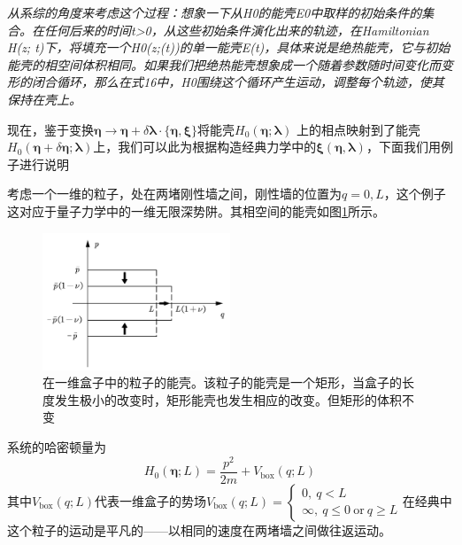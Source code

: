 \emph{从系综的角度来考虑这个过程：想象一下从H0的能壳E0中取样的初始条件的集合。在任何后来的时间t>0，从这些初始条件演化出来的轨迹，在Hamiltonian H(z; t)下，将填充一个H0(z;(t))的单一能壳E(t)，具体来说是绝热能壳，它与初始能壳的相空间体积相同。如果我们把绝热能壳想象成一个随着参数随时间变化而变形的闭合循环，那么在式16中，H0围绕这个循环产生运动，调整每个轨迹，使其保持在壳上。}

现在，鉴于变换$\bm{\eta} \to \bm{\eta} + \delta  \bm{\lambda} \cdot \{\bm{\eta}, \boldsymbol{\xi}\}$将能壳$H_{0}(\bm{\eta} ; \boldsymbol{\lambda})$ 上的相点映射到了能壳 $ H_{0}(\bm{\eta} + \delta \bm{\eta} ; \boldsymbol{\lambda})$上，我们可以此为根据构造经典力学中的$\boldsymbol{\xi}(\bm{\eta}, \boldsymbol{\lambda})$，下面我们用例子进行说明

考虑一个一维的粒子，处在两堵刚性墙之间，刚性墙的位置为$q=0,L$，这个例子这对应于量子力学中的一维无限深势阱。其相空间的能壳如图\ref{p2.1}所示。
\begin{figure}[!htbp]
    \begin{center}
        \includegraphics[width=0.5\textwidth]{figures/p2.1.pdf}
    \end{center}
    \caption{在一维盒子中的粒子的能壳。该粒子的能壳是一个矩形，当盒子的长度发生极小的改变时，矩形能壳也发生相应的改变。但矩形的体积不变}
    \label{p2.1}
\end{figure}

系统的哈密顿量为
\begin{equation}
     H_{0}(\bm{\eta} ; L)=\frac{p^{2}}{2 m}+V_{\mathrm{box}}(q ; L)
        \label{eq2.18}
\end{equation}
其中$V_{\mathrm{box}}(q ; L)$代表一维盒子的势场$V_{\mathrm{box}}(q ; L) = \left\{\begin{array}{l} 0 ,\ q<L\\ \infty ,\ q \leq 0\ \text{or}\ q \geq L \end{array}\right.$在经典中这个粒子的运动是平凡的——以相同的速度在两堵墙之间做往返运动。
    
